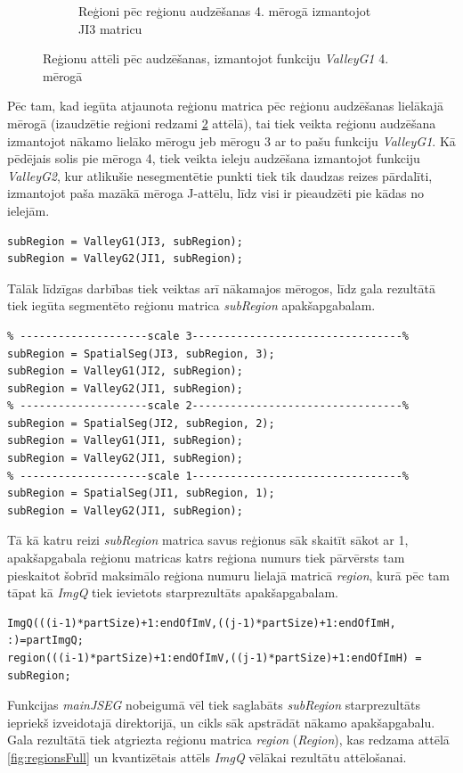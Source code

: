 \documentclass[12pt,paper=a4]{report}
\begin{document}
\begin{figure}[h!]
\begin{subfigure}[b]{.3\linewidth}
\caption{Reģioni pēc reģionu audzēšanas 4. mērogā izmantojot JI3 matricu}
\label{subfig:valleyg1s4ji3}
\end{subfigure}
\caption{Reģionu attēli pēc audzēšanas, izmantojot funkciju \textit{ValleyG1} 4. mērogā}
\end{figure}
Pēc tam, kad iegūta atjaunota reģionu matrica pēc reģionu audzēšanas lielākajā mērogā (izaudzētie reģioni redzami \ref{subfig:valleyg1s4ji3} attēlā), tai tiek veikta reģionu audzēšana izmantojot nākamo lielāko mērogu jeb mērogu 3 ar to pašu funkciju \textit{ValleyG1}. Kā pēdējais solis pie mēroga 4, tiek veikta ieleju audzēšana izmantojot funkciju \textit{ValleyG2}, kur atlikušie nesegmentētie punkti tiek tik daudzas reizes pārdalīti, izmantojot paša mazākā mēroga J-attēlu, līdz visi ir pieaudzēti pie kādas no ielejām.
\begin{lstlisting}
subRegion = ValleyG1(JI3, subRegion);
subRegion = ValleyG2(JI1, subRegion);
\end{lstlisting}\par
Tālāk līdzīgas darbības tiek veiktas arī nākamajos mērogos, līdz gala rezultātā tiek iegūta segmentēto reģionu matrica \textit{subRegion} apakšapgabalam. 
\begin{lstlisting}
% --------------------scale 3---------------------------------%
subRegion = SpatialSeg(JI3, subRegion, 3);
subRegion = ValleyG1(JI2, subRegion);
subRegion = ValleyG2(JI1, subRegion);
% --------------------scale 2---------------------------------%
subRegion = SpatialSeg(JI2, subRegion, 2);
subRegion = ValleyG1(JI1, subRegion);
subRegion = ValleyG2(JI1, subRegion);
% --------------------scale 1---------------------------------%
subRegion = SpatialSeg(JI1, subRegion, 1);
subRegion = ValleyG2(JI1, subRegion);
\end{lstlisting}\par
Tā kā katru reizi \textit{subRegion} matrica savus reģionus sāk skaitīt sākot ar 1, apakšapgabala reģionu matricas katrs reģiona numurs tiek pārvērsts tam pieskaitot šobrīd maksimālo reģiona numuru lielajā matricā \textit{region}, kurā pēc tam tāpat kā \textit{ImgQ} tiek ievietots starprezultāts apakšapgabalam.
\begin{lstlisting}
ImgQ(((i-1)*partSize)+1:endOfImV,((j-1)*partSize)+1:endOfImH, :)=partImgQ;
region(((i-1)*partSize)+1:endOfImV,((j-1)*partSize)+1:endOfImH) = subRegion;
\end{lstlisting}\par
Funkcijas \textit{mainJSEG} nobeigumā vēl tiek saglabāts \textit{subRegion} starprezultāts iepriekš izveidotajā direktorijā, un cikls sāk apstrādāt nākamo apakšapgabalu. Gala rezultātā tiek atgriezta reģionu matrica \textit{region} (\textit{Region}), kas redzama attēlā \ref{fig:regionsFull} un kvantizētais attēls \textit{ImgQ} vēlākai rezultātu attēlošanai.
\end{document}
